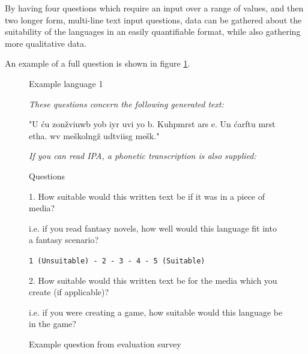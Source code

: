 \documentclass{report}
\begin{document}
	By having four questions which require an input over a range of values, and then two longer form, multi-line text input questions, data can be gathered about the suitability of the languages in an easily quantifiable format, while also gathering more qualitative data.
	
	An example of a full question is shown in figure \ref{example question from evaluation survey}.
	
	\begin{figure}
		\caption{Example question from evaluation survey}
		\label{example question from evaluation survey}
		\centering
		\begin{tcolorbox}
			\begin{Large}Example language 1\end{Large}
			\footnotesize
			\textit{These questions concern the following generated text:}
			
			"U \'{c}u zon\v{z}viuwb yo\dh{}b \dh{}iyr\dj{} uvi yo\dh{} b. Kuhpm\-{o}rst ars e. Un \'{c}arƒt\-{o}u mrst etha. wv me\v{s}kolng\v{z} udtviisg me\v{s}k."
			
			\vspace{0.3cm}
			
			\textit{If you can read IPA, a phonetic transcription is also supplied:}
			
			
			\vspace{0.3cm}
			
			\begin{Large}Questions\end{Large}
			
			1. How suitable would this written text be if it was in a piece of media?
			\begin{small}
				i.e. if you read fantasy novels, how well would this language fit into a fantasy scenario?
			\end{small}
		
			\begin{center}
				\texttt{1 (Unsuitable) - 2 - 3 - 4 - 5 (Suitable)}
			\end{center}
			
			\vspace{0.3cm}
			
			2. How suitable would this written text be for the media which you create (if applicable)?
			\begin{small}
				i.e. if you were creating a game, how suitable would this language be in the game?
			\end{small}
		

\end{tcolorbox}
\end{figure}
\end{document}
